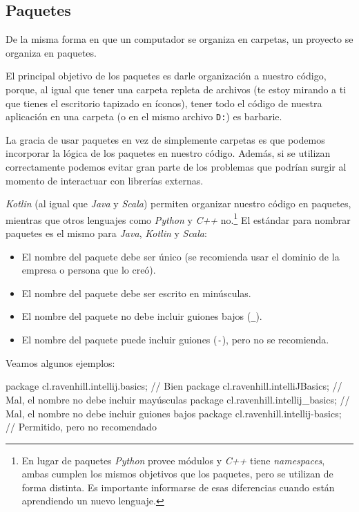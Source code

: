 
\subsection{Paquetes}
  De la misma forma en que un computador se organiza en carpetas, un proyecto se organiza en 
  paquetes.

  El principal objetivo de los paquetes es darle organización a nuestro código, porque, al igual 
  que tener una carpeta repleta de archivos (te estoy mirando a ti que tienes el escritorio 
  tapizado en íconos), tener todo el código de nuestra aplicación en una carpeta (o en el mismo 
  archivo \texttt{D:}) es barbarie.

  La gracia de usar paquetes en vez de simplemente carpetas es que podemos incorporar la lógica de
  los paquetes en nuestro código.
  Además, si se utilizan correctamente podemos evitar gran parte de los problemas que podrían
  surgir al momento de interactuar con librerías externas.

  \textit{Kotlin} (al igual que \textit{Java} y \textit{Scala}) permiten organizar nuestro código 
  en paquetes, mientras que otros lenguajes como \textit{Python} y \textit{C++} 
  no.\footnote{En lugar de paquetes \textit{Python} provee módulos y \textit{C++} tiene 
  \textit{namespaces}, ambas cumplen los mismos objetivos que los paquetes, pero se utilizan de 
  forma distinta. 
  Es importante informarse de esas diferencias cuando están aprendiendo un nuevo lenguaje.}
  El estándar para nombrar paquetes es el mismo para \textit{Java}, \textit{Kotlin} y 
  \textit{Scala}: 
  \begin{itemize}
    \item El nombre del paquete debe ser único (se recomienda usar el dominio de la empresa o 
      persona que lo creó).
    \item El nombre del paquete debe ser escrito en minúsculas.
    \item El nombre del paquete no debe incluir guiones bajos (\texttt{\_}).
    \item El nombre del paquete puede incluir guiones (\texttt{-}), pero no se recomienda.
  \end{itemize}

  Veamos algunos ejemplos:

  \begin{kotlin}
    package cl.ravenhill.intellij.basics; // Bien
    package cl.ravenhill.intelliJBasics; // Mal, el nombre no debe incluir mayúsculas
    package cl.ravenhill.intellij_basics; // Mal, el nombre no debe incluir guiones bajos
    package cl.ravenhill.intellij-basics; // Permitido, pero no recomendado
  \end{kotlin}

